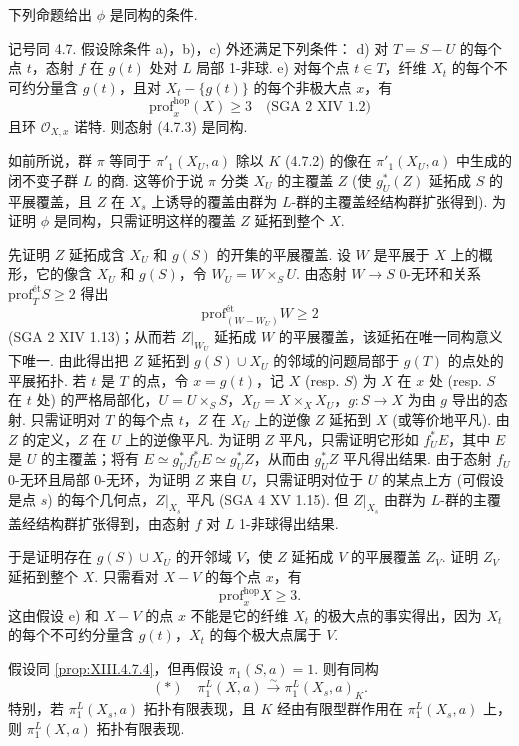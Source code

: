 下列命题给出 $\phi$ 是同构的条件.

\begin{proposition}\label{prop:XIII.4.7.4}
记号同 4.7. 假设除条件 a)，b)，c) 外还满足下列条件：
d) 对 $T = S - U$ 的每个点 $t$，态射 $f$ 在 $g(t)$ 处对 $L$ 局部 1-非球.
e) 对每个点 $t \in T$，纤维 $X_t$ 的每个不可约分量含 $g(t)$，且对 $X_t - \{g(t)\}$ 的每个非极大点 $x$，有
\[
\mathrm{prof}^{\mathrm{hop}}_x(X) \geqslant 3 \quad \text{(SGA 2 XIV 1.2)}
\]
且环 $\mathcal{O}_{X, x}$ 诺特.
则态射 (4.7.3) 是同构.
\end{proposition}

如前所说，群 $\pi$ 等同于 $\pi'_1(X_U, a)$ 除以 $K$ (4.7.2) 的像在 $\pi'_1(X_U, a)$ 中生成的闭不变子群 $L$ 的商. 这等价于说 $\pi$ 分类 $X_U$ 的主覆盖 $Z$ (使 $g^{*}_U(Z)$ 延拓成 $S$ 的平展覆盖，且 $Z$ 在 $X_s$ 上诱导的覆盖由群为 $L$-群的主覆盖经结构群扩张得到). 为证明 $\phi$ 是同构，只需证明这样的覆盖 $Z$ 延拓到整个 $X$.

先证明 $Z$ 延拓成含 $X_U$ 和 $g(S)$ 的开集的平展覆盖. 设 $W$ 是平展于 $X$ 上的概形，它的像含 $X_U$ 和 $g(S)$，令 $W_U = W \times_S U$. 由态射 $W \to S$ 0-无环和关系 $\mathrm{prof}^{\mathrm{ét}}_T S \geqslant 2$ 得出
\[
\mathrm{prof}^{\mathrm{ét}}_{(W - W_U)} W \geqslant 2
\]
(SGA 2 XIV 1.13)；从而若 $Z|_{W_U}$ 延拓成 $W$ 的平展覆盖，该延拓在唯一同构意义下唯一. 由此得出把 $Z$ 延拓到 $g(S) \cup X_U$ 的邻域的问题局部于 $g(T)$ 的点处的平展拓扑. 若 $t$ 是 $T$ 的点，令 $x = g(t)$，记 $X$ (resp. $S$) 为 $X$ 在 $x$ 处 (resp. $S$ 在 $t$ 处) 的严格局部化，$U = U \times_S S$，$X_U = X \times_X X_U$，$g \colon S \to X$ 为由 $g$ 导出的态射. 只需证明对 $T$ 的每个点 $t$，$Z$ 在 $X_U$ 上的逆像 $Z$ 延拓到 $X$ (或等价地平凡). 由 $Z$ 的定义，$Z$ 在 $U$ 上的逆像平凡. 为证明 $Z$ 平凡，只需证明它形如 $f^{*}_U E$，其中 $E$ 是 $U$ 的主覆盖；将有 $E \simeq g^{*}_U f^{*}_U E \simeq g^{*}_U Z$，从而由 $g^{*}_U Z$ 平凡得出结果. 由于态射 $f_U$ 0-无环且局部 0-无环，为证明 $Z$ 来自 $U$，只需证明对位于 $U$ 的某点上方 (可假设是点 $s$) 的每个几何点，$Z|_{X_s}$ 平凡 (SGA 4 XV 1.15). 但 $Z|_{X_s}$ 由群为 $L$-群的主覆盖经结构群扩张得到，由态射 $f$ 对 $L$ 1-非球得出结果.

于是证明存在 $g(S) \cup X_U$ 的开邻域 $V$，使 $Z$ 延拓成 $V$ 的平展覆盖 $Z_V$. 证明 $Z_V$ 延拓到整个 $X$. 只需看对 $X - V$ 的每个点 $x$，有
\[
\mathrm{prof}^{\mathrm{hop}}_x X \geqslant 3.
\]
这由假设 e) 和 $X - V$ 的点 $x$ 不能是它的纤维 $X_t$ 的极大点的事实得出，因为 $X_t$ 的每个不可约分量含 $g(t)$，$X_t$ 的每个极大点属于 $V$.

\begin{corollary}\label{cor:XIII.4.8}
假设同 \ref{prop:XIII.4.7.4}，但再假设 $\pi_1(S, a) = 1$. 则有同构
\[
(\ast) \quad \pi^L_1(X, a) \xrightarrow{\sim} \pi^L_1(X_s, a)_K.
\]
特别，若 $\pi^L_1(X_s, a)$ 拓扑有限表现，且 $K$ 经由有限型群作用在 $\pi^L_1(X_s, a)$ 上，则 $\pi^L_1(X, a)$ 拓扑有限表现.
\end{corollary}

